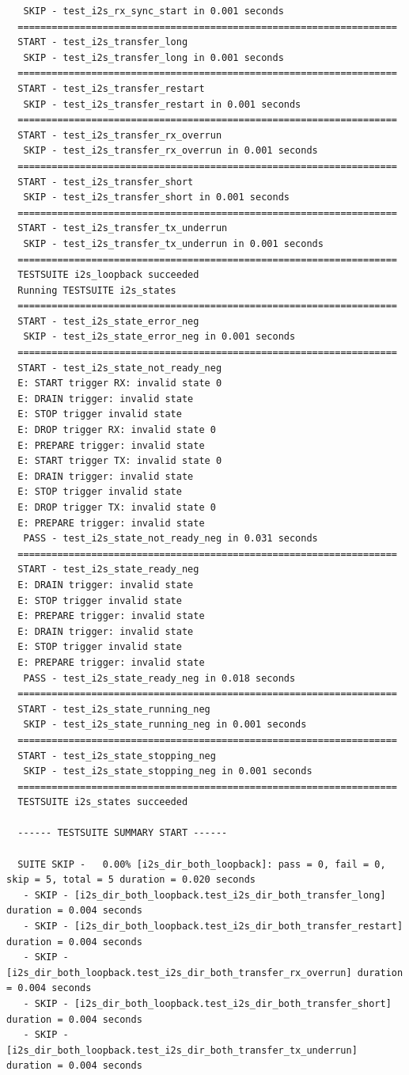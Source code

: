 \documentclass[11pt,a4paper,oneside]{article}
\begin{document}
\begin{lstlisting}
   SKIP - test_i2s_rx_sync_start in 0.001 seconds
  ===================================================================
  START - test_i2s_transfer_long
   SKIP - test_i2s_transfer_long in 0.001 seconds
  ===================================================================
  START - test_i2s_transfer_restart
   SKIP - test_i2s_transfer_restart in 0.001 seconds
  ===================================================================
  START - test_i2s_transfer_rx_overrun
   SKIP - test_i2s_transfer_rx_overrun in 0.001 seconds
  ===================================================================
  START - test_i2s_transfer_short
   SKIP - test_i2s_transfer_short in 0.001 seconds
  ===================================================================
  START - test_i2s_transfer_tx_underrun
   SKIP - test_i2s_transfer_tx_underrun in 0.001 seconds
  ===================================================================
  TESTSUITE i2s_loopback succeeded
  Running TESTSUITE i2s_states
  ===================================================================
  START - test_i2s_state_error_neg
   SKIP - test_i2s_state_error_neg in 0.001 seconds
  ===================================================================
  START - test_i2s_state_not_ready_neg
  E: START trigger RX: invalid state 0
  E: DRAIN trigger: invalid state
  E: STOP trigger invalid state
  E: DROP trigger RX: invalid state 0
  E: PREPARE trigger: invalid state
  E: START trigger TX: invalid state 0
  E: DRAIN trigger: invalid state
  E: STOP trigger invalid state
  E: DROP trigger TX: invalid state 0
  E: PREPARE trigger: invalid state
   PASS - test_i2s_state_not_ready_neg in 0.031 seconds
  ===================================================================
  START - test_i2s_state_ready_neg
  E: DRAIN trigger: invalid state
  E: STOP trigger invalid state
  E: PREPARE trigger: invalid state
  E: DRAIN trigger: invalid state
  E: STOP trigger invalid state
  E: PREPARE trigger: invalid state
   PASS - test_i2s_state_ready_neg in 0.018 seconds
  ===================================================================
  START - test_i2s_state_running_neg
   SKIP - test_i2s_state_running_neg in 0.001 seconds
  ===================================================================
  START - test_i2s_state_stopping_neg
   SKIP - test_i2s_state_stopping_neg in 0.001 seconds
  ===================================================================
  TESTSUITE i2s_states succeeded

  ------ TESTSUITE SUMMARY START ------

  SUITE SKIP -   0.00% [i2s_dir_both_loopback]: pass = 0, fail = 0, skip = 5, total = 5 duration = 0.020 seconds
   - SKIP - [i2s_dir_both_loopback.test_i2s_dir_both_transfer_long] duration = 0.004 seconds
   - SKIP - [i2s_dir_both_loopback.test_i2s_dir_both_transfer_restart] duration = 0.004 seconds
   - SKIP - [i2s_dir_both_loopback.test_i2s_dir_both_transfer_rx_overrun] duration = 0.004 seconds
   - SKIP - [i2s_dir_both_loopback.test_i2s_dir_both_transfer_short] duration = 0.004 seconds
   - SKIP - [i2s_dir_both_loopback.test_i2s_dir_both_transfer_tx_underrun] duration = 0.004 seconds


\end{lstlisting}
\end{document}

